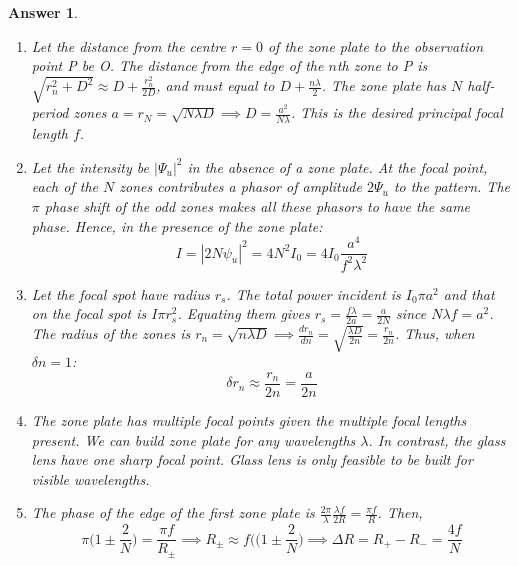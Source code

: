 \documentclass[a4paper]{article}
\newtheorem{ans}{Answer}[section]
\theoremstyle{new}
\begin{document}
\begin{ans}\leavevmode
\begin{enumerate}[label=(\alph*)]
\item Let the distance from the centre $r=0$ of the zone plate to the observation point P be O. The distance from the edge of the $n$th zone to P is $\sqrt{r_n^2+D^2}\approx D+\frac{r_n^2}{2D}$, and must equal to $D+\frac{n\lambda}{2}$. The zone plate has $N$ half-period zones $a=r_N=\sqrt{N\lambda D}\implies D=\frac{a^2}{N\lambda}$. This is the desired principal focal length $f$.
\item Let the intensity be $|\Psi_u|^2$ in the absence of a zone plate. At the focal point, each of the $N$ zones contributes a phasor of amplitude $2\Psi_u$ to the pattern. The $\pi$ phase shift of the odd zones makes all these phasors to have the same phase. Hence, in the presence of the zone plate:
$$I=|2N\psi_u|^2=4N^2I_0=4I_0\frac{a^4}{f^2\lambda^2}$$
\item Let the focal spot have radius $r_s$. The total power incident is $I_0\pi a^2$ and that on the focal spot is $I\pi r_s^2$. Equating them gives $r_s=\frac{f\lambda}{2a}=\frac{a}{2N}$ since $N\lambda f=a^2$. The radius of the zones is $r_n=\sqrt{n\lambda D}\implies\frac{d r_n}{dn}=\sqrt{\frac{\lambda D}{2n}}=\frac{r_n}{2n}$. Thus, when $\delta n=1$:
$$\delta r_n\approx\frac{r_n}{2n}=\frac{a}{2n}$$
\item The zone plate has multiple focal points given the multiple focal lengths present. We can build zone plate for any wavelengths $\lambda$. In contrast, the glass lens have one sharp focal point. Glass lens is only feasible to be built for visible wavelengths.
\item The phase of the edge of the first zone plate is $\frac{2\pi}{\lambda}\frac{\lambda f}{2R}=\frac{\pi f}{R}$. Then,
$$\pi\bigg(1\pm\frac{2}{N}\bigg)=\frac{\pi f}{R_\pm}\implies R_\pm\approx f(\bigg(1\pm\frac{2}{N}\bigg)\implies\Delta R=R_+-R_-=\frac{4f}{N}$$
\end{enumerate}
\end{ans}
\newpage
\end{document}
